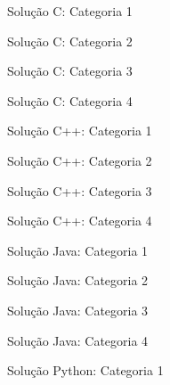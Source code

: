 \begin{frame}[fragile]{Solução C: Categoria 1}
\end{frame}

\begin{frame}[fragile]{Solução C: Categoria 2}
\end{frame}

\begin{frame}[fragile]{Solução C: Categoria 3}
\end{frame}

\begin{frame}[fragile]{Solução C: Categoria 4}
\end{frame}

\begin{frame}[fragile]{Solução C++: Categoria 1}
\end{frame}

\begin{frame}[fragile]{Solução C++: Categoria 2}
\end{frame}

\begin{frame}[fragile]{Solução C++: Categoria 3}
\end{frame}

\begin{frame}[fragile]{Solução C++: Categoria 4}
\end{frame}

\begin{frame}[fragile]{Solução Java: Categoria 1}
\end{frame}

\begin{frame}[fragile]{Solução Java: Categoria 2}
\end{frame}

\begin{frame}[fragile]{Solução Java: Categoria 3}
\end{frame}

\begin{frame}[fragile]{Solução Java: Categoria 4}
\end{frame}

\begin{frame}[fragile]{Solução Python: Categoria 1}
\end{frame}


